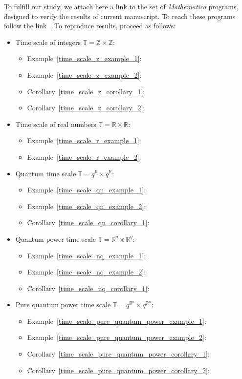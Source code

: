 To fulfill our study, we attach here a link to the set of \emph{Mathematica} programs, designed to verify the results of current manuscript.
To reach these programs follow the link~\cite{kolosov2022mathematica}.
To reproduce results, proceed as follows:
\begin{itemize}
    \item Time scale of integers $\mathbb{T} = \mathbb{Z} \times \mathbb{Z}$:
    \begin{itemize}
        \item Example~\ref{time_scale_z_example_1}:
        \item Example~\ref{time_scale_z_example_2}:
        \item Corollary~\ref{time_scale_z_corollary_1}:
        \item Corollary~\ref{time_scale_z_corollary_2}:
    \end{itemize}
    \item Time scale of real numbers $\mathbb{T} = \mathbb{R} \times \mathbb{R}$:
    \begin{itemize}
        \item Example~\ref{time_scale_r_example_1}:
        \item Example~\ref{time_scale_r_example_2}:
    \end{itemize}
    \item Quantum time scale $\mathbb{T} = q^\mathbb{R} \times q^\mathbb{R}$:
    \begin{itemize}
        \item Example~\ref{time_scale_qn_example_1}:
        \item Example~\ref{time_scale_qn_example_2}:
        \item Corollary~\ref{time_scale_qn_corollary_1}:
    \end{itemize}
    \item Quantum power time scale $\mathbb{T} = \mathbb{R}^q \times \mathbb{R}^q$:
    \begin{itemize}
        \item Example~\ref{time_scale_nq_example_1}:
        \item Example~\ref{time_scale_nq_example_2}:
        \item Corollary~\ref{time_scale_nq_corollary_1}:
    \end{itemize}
    \item Pure quantum power time scale $\mathbb{T} = q^{\mathbb{R}^n} \times q^{\mathbb{R}^n}$:
    \begin{itemize}
        \item Example~\ref{time_scale_pure_quantum_power_example_1}:
        \item Example~\ref{time_scale_pure_quantum_power_example_2}:
        \item Corollary~\ref{time_scale_pure_quantum_power_corollary_1}:
        \item Corollary~\ref{time_scale_pure_quantum_power_corollary_2}:
    \end{itemize}
\end{itemize}
